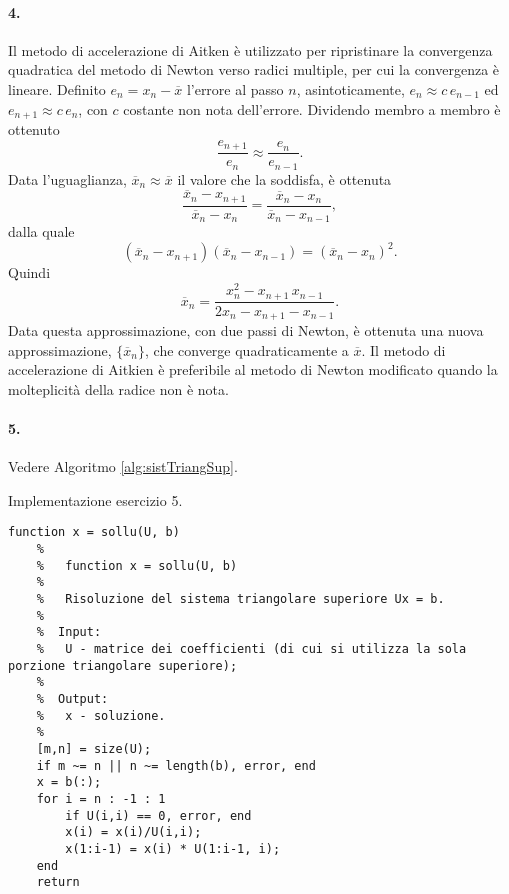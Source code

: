 \paragraph{4.}
Il metodo di accelerazione di Aitken è utilizzato per ripristinare la convergenza quadratica del metodo di Newton verso radici multiple, per cui la convergenza è lineare. Definito $e_n=x_n-\overline{x}$ l'errore al passo $n$, asintoticamente, $e_n\approx c \, e_{n-1}$ ed $e_{n+1}\approx c\, e_n$, con $c$ costante non nota dell'errore. Dividendo membro a membro è ottenuto
\begin{equation*}
    \frac{e_{n+1}}{e_n}\approx\frac{e_n}{e_{n-1}}.
\end{equation*}
Data  l'uguaglianza, $\overline x_n\approx \overline x$ il valore che la soddisfa, è ottenuta
\begin{equation*}
    \frac{\overline x_n - x_{n+1}}{\overline x_n - x_n} =\frac{\overline x_n - x_n}{\overline x_n - x_{n-1}},
\end{equation*}
dalla quale 
\begin{equation*}
    (\overline x_n-x_{n+1})(\overline x_n - x_{n-1})=(\overline x_n - x_n)^2.
\end{equation*}
Quindi
\begin{equation*}
    \overline x_n = \frac{x^2_n-x_{n+1}\,x_{n-1}}{2x_n - x_{n+1} - x_{n-1}}.
\end{equation*}
Data questa approssimazione, con due passi di Newton, è ottenuta una nuova approssimazione, $\{\overline x_n\}$, che converge quadraticamente a $\overline x$. Il metodo di accelerazione di Aitkien è preferibile al metodo di Newton modificato quando la molteplicità della radice non è nota.

\paragraph{5.} Vedere Algoritmo \ref{alg:sistTriangSup}.

\begin{algorithm}
\caption{Implementazione esercizio 5.}\label{alg:sistTriangSup}
    \begin{lstlisting}[style=Matlab-editor]
    function x = sollu(U, b)
    %   
    %   function x = sollu(U, b)
    %
    %   Risoluzione del sistema triangolare superiore Ux = b.
    %
    %  Input:
    %   U - matrice dei coefficienti (di cui si utilizza la sola porzione triangolare superiore);
    %
    %  Output:
    %   x - soluzione.
    %
    [m,n] = size(U);
    if m ~= n || n ~= length(b), error, end
    x = b(:);
    for i = n : -1 : 1
        if U(i,i) == 0, error, end
        x(i) = x(i)/U(i,i);
        x(1:i-1) = x(i) * U(1:i-1, i);
    end
    return
    \end{lstlisting}
\end{algorithm}

